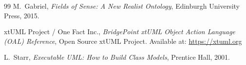 \documentclass[11pt,a4paper]{article}
\theoremstyle{definition}
\theoremstyle{plain}
\theoremstyle{remark}
\begin{document}
\begin{thebibliography}{99}
M.~Gabriel, \emph{Fields of Sense: A New Realist Ontology}, Edinburgh University Press, 2015.

xtUML Project / One Fact Inc., \emph{BridgePoint xtUML Object Action Language (OAL) Reference}, Open Source xtUML Project. Available at: \url{https://xtuml.org}

L.~Starr, \emph{Executable UML: How to Build Class Models}, Prentice Hall, 2001.

\end{thebibliography}
\end{document}

